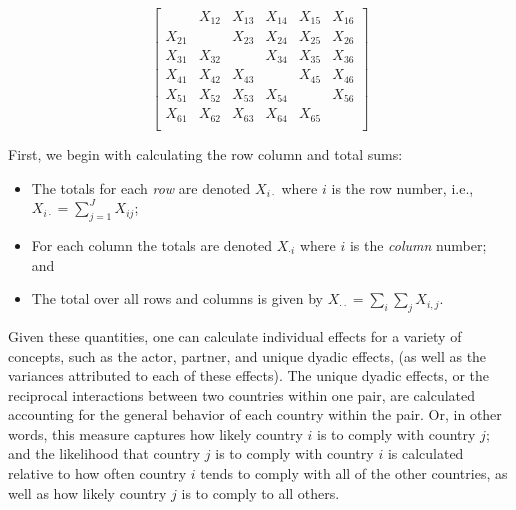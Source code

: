 \singlespacing
\[
\left[
\begin{array}{cccccc}
 & X_{12}  & X_{13}  & X_{14} & X_{15} & X_{16} \\
X_{21}  &  & X_{23}  & X_{24} & X_{25} & X_{26} \\
X_{31}  & X_{32}  &    & X_{34} & X_{35} & X_{36} \\
X_{41}  & X_{42}  & X_{43}  &  & X_{45} & X_{46} \\
X_{51}  & X_{52}  & X_{53}  & X_{54} &   & X_{56} \\
X_{61}  & X_{62}  & X_{63}  & X_{64} & X_{65} &   \\
\end{array}
\right]
\]

\doublespacing
First, we begin with calculating the row column and total sums:

\begin{itemize}
	\item The totals for each \emph{ row} are denoted $X_{i \cdot}$ where $i$ is the row number, i.e.,
	~\\
	$X_{i \cdot} = \sum_{j=1}^{J} X_{ij}$;
	\item For each column the totals are denoted
	 $X_{\cdot i}$ where $i$ is the \emph{column} number; and 
	 \item The total over all rows and columns is given by $X_{\cdot \cdot} = \sum_i \sum_j X_{i,j}$.
 \end{itemize}
 
Given these quantities, one can calculate individual effects for a variety of concepts, such as the actor, partner, and unique dyadic effects, (as well as the variances attributed to each of these effects). The unique dyadic effects, or the reciprocal interactions between two countries within one pair, are calculated accounting for the general behavior of each country within the pair. Or, in other words, this measure captures how likely country $i$ is to comply with country $j$; and the likelihood that country $j$ is to comply with country $i$ is calculated relative to how often country $i$ tends to comply with all of the other countries, as well as how likely country $j$ is to comply to all others. 

